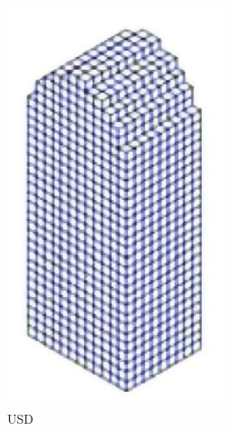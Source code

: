 \begin{description}
\begin{figure}[H]
\begin{subfigure}[b]{0.2\textwidth}
			\includegraphics[width=\textwidth]{images/spatial_decomposition_usd}
			\caption{USD}
			\label{fig:spatial_decomposition_usd}
		\end{subfigure}
		\begin{subfigure}[b]{0.2\textwidth}
			\centering

\end{subfigure}
\end{figure}
\end{description}
